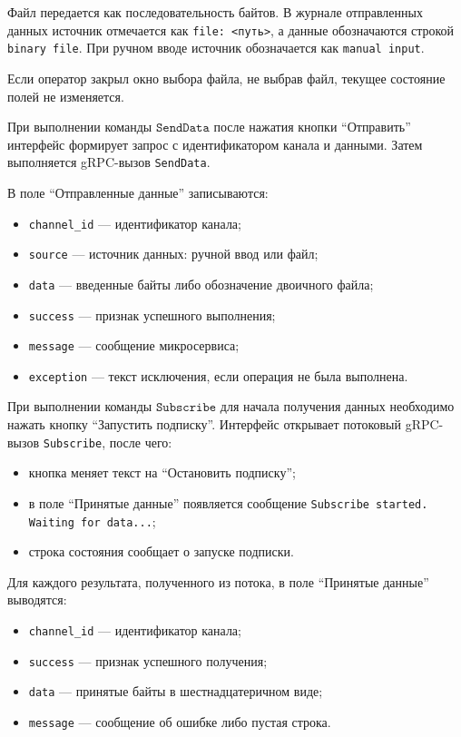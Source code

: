Файл передается как последовательность байтов. В журнале отправленных данных
источник отмечается как \texttt{file: <путь>}, а данные обозначаются строкой
\texttt{binary file}. При ручном вводе источник обозначается как
\texttt{manual input}.

Если оператор закрыл окно выбора файла, не выбрав файл, текущее состояние
полей не изменяется.

При выполнении команды $\mathtt{SendData}$ после нажатия кнопки ``Отправить'' интерфейс формирует запрос с идентификатором
канала и данными. Затем выполняется gRPC-вызов \texttt{SendData}.

В поле ``Отправленные данные'' записываются:

\begin{itemize}
	\item \texttt{channel\_id} --- идентификатор канала;
	\item \texttt{source} --- источник данных: ручной ввод или файл;
	\item \texttt{data} --- введенные байты либо обозначение двоичного файла;
	\item \texttt{success} --- признак успешного выполнения;
	\item \texttt{message} --- сообщение микросервиса;
	\item \texttt{exception} --- текст исключения, если операция не была выполнена.
\end{itemize}

При выполнении команды $\mathtt{Subscribe}$ для начала получения данных необходимо нажать кнопку
``Запустить подписку''. Интерфейс открывает потоковый gRPC-вызов
\texttt{Subscribe}, после чего:

\begin{itemize}
	\item кнопка меняет текст на ``Остановить подписку'';
	\item в поле ``Принятые данные'' появляется сообщение \texttt{Subscribe started. Waiting for data...};
	\item строка состояния сообщает о запуске подписки.
\end{itemize}

Для каждого результата, полученного из потока, в поле ``Принятые данные''
выводятся:

\begin{itemize}
	\item \texttt{channel\_id} --- идентификатор канала;
	\item \texttt{success} --- признак успешного получения;
	\item \texttt{data} --- принятые байты в шестнадцатеричном виде;
	\item \texttt{message} --- сообщение об ошибке либо пустая строка.
\end{itemize}

